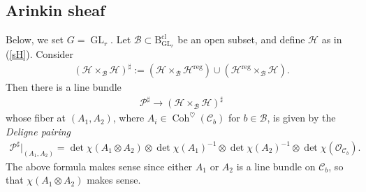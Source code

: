 \documentclass[11pt,oneside,a4paper,mathscr]{amsart}
\theoremstyle{definition}
\newcommand{\cH}{\mathcal{H}}
\newcommand{\cB}{\mathcal{B}}
\newcommand{\cC}{\mathcal{C}}
\newcommand{\cP}{\mathcal{P}}
\newcommand{\rB}{\mathrm{B}}
\newcommand{\Coh}{\operatorname{Coh}}
\newcommand{\GL}{\operatorname{GL}}
\begin{document}
\subsection{Arinkin sheaf}\label{subsec:Arsheaf}
Below, we set $G=\GL_r$. 
Let $\cB \subset \rB_{\GL_r}^{\mathrm{cl}}$ be an open subset, and define $\cH$ as in (\ref{sH}). 
Consider 
\begin{align}\label{Psharp}
    (\cH\times_{\cB}\cH)^{\sharp}:=
    (\cH\times_{\cB}\cH^{\mathrm{reg}}) \cup (\cH^{\mathrm{reg}}\times_{\cB}\cH).
\end{align}
Then there is a line bundle 
\begin{align*}
    \cP^{\sharp} \to  (\cH\times_{\cB}\cH)^{\sharp}
\end{align*}
whose fiber at $(A_1, A_2)$, where $A_i \in \Coh^{\heartsuit}(\cC_b)$
for $b\in \cB$, is given by the \textit{Deligne pairing}
\begin{align}\label{def:Psharp}
     \cP^{\sharp}|_{(A_1, A_2)}=\det \chi(A_1\otimes A_2)\otimes \det \chi(A_1)^{-1}\otimes \det \chi(A_2)^{-1}\otimes \det \chi(\mathcal{O}_{\cC_b}).
\end{align}
The above formula makes sense since either $A_1$ or $A_2$ is a line bundle on $\cC_b$, 
so that $\chi(A_1\otimes A_2)$ makes sense. 
\end{document}
